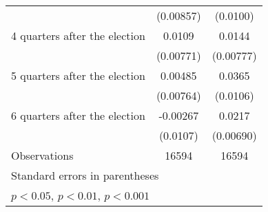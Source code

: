 \begin{table}[htbp]
\begin{tabular}{l*{2}{c}}
                    &   (0.00857)         &    (0.0100)         \\
[1em]
 4 quarters after the election&      0.0109         &      0.0144         \\
                    &   (0.00771)         &   (0.00777)         \\
[1em]
 5 quarters after the election&     0.00485         &      0.0365\sym{***}\\
                    &   (0.00764)         &    (0.0106)         \\
[1em]
 6 quarters after the election&    -0.00267         &      0.0217\sym{**} \\
                    &    (0.0107)         &   (0.00690)         \\
\hline
Observations        &       16594         &       16594         \\
\hline\hline
\multicolumn{3}{l}{\footnotesize Standard errors in parentheses}\\
\multicolumn{3}{l}{\footnotesize \sym{*} \(p<0.05\), \sym{**} \(p<0.01\), \sym{***} \(p<0.001\)}\\
\end{tabular}
\end{table}
